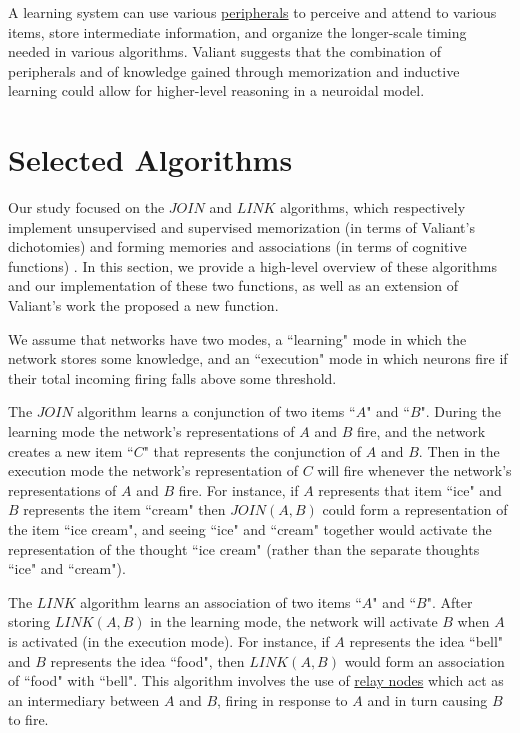\documentclass[letterpaper, 12pt]{article}
\begin{document}
A learning system can use various \underline{peripherals} to perceive and attend to various items, store intermediate information, and organize the longer-scale timing needed in various algorithms. Valiant suggests that the combination of peripherals and of knowledge gained through memorization and inductive learning could allow for higher-level reasoning in a neuroidal model.

\section{Selected Algorithms}\label{sec:selected_algorithms}
Our study focused on the $JOIN$ and $LINK$ algorithms, which respectively implement unsupervised and supervised memorization (in terms of Valiant's dichotomies) and forming memories and associations (in terms of cognitive functions) \cite{valiant_circuits_1994, papadimitriou_cortical_2015}. In this section, we provide a high-level overview of these algorithms and our implementation of these two functions, as well as an extension of Valiant's work the proposed a new function.

We assume that networks have two modes, a ``learning" mode in which the network stores some knowledge, and an ``execution" mode in which neurons fire if their total incoming firing falls above some threshold. 

The $JOIN$ algorithm learns a conjunction of two items ``$A$" and ``$B$". During the learning mode the network's representations of $A$ and $B$ fire, and the network creates a new item ``$C$" that represents the conjunction of $A$ and $B$. Then in the execution mode the network's representation of $C$ will fire whenever the network's representations of $A$ and $B$ fire. For instance, if $A$ represents that item ``ice" and $B$ represents the item ``cream" then $JOIN(A,B)$ could form a representation of the item ``ice cream", and seeing ``ice" and ``cream" together would activate the representation of the thought ``ice cream" (rather than the separate thoughts ``ice" and ``cream").

The $LINK$ algorithm learns an association of two items ``$A$" and ``$B$". After storing $LINK(A,B)$ in the learning mode, the network will activate $B$ when $A$ is activated (in the execution mode). For instance, if $A$ represents the idea ``bell" and $B$ represents the idea ``food", then $LINK(A,B)$ would form an association of ``food" with ``bell". This algorithm involves the use of \underline{relay nodes} which act as an intermediary between $A$ and $B$, firing in response to $A$ and in turn causing $B$ to fire.
\end{document}
